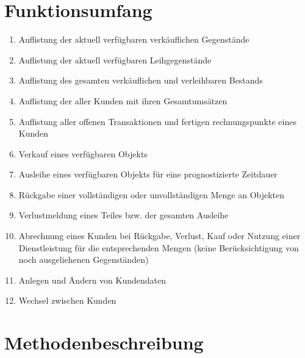 \documentclass[a4paper,12pt,titlepage]{article}
\begin{document}
\part{Funktionsumfang}
\begin{enumerate}
\item Auflistung der aktuell verfügbaren verkäuflichen Gegenstände
\item Auflistung der aktuell verfügbaren  Leihgegenstände
\item Auflistung des gesamten verkäuflichen und verleihbaren Bestands
\item Auflistung der aller Kunden mit ihren Gesamtumsätzen
\item Auflistung aller offenen Transaktionen  und fertigen rechnungspunkte eines Kunden
\item Verkauf eines verfügbaren Objekts
\item Ausleihe eines verfügbaren Objekts für eine prognostizierte Zeitdauer
\item Rückgabe einer vollständigen oder unvollständigen Menge an Objekten
\item Verlustmeldung eines Teiles bzw. der gesamten Ausleihe
\item Abrechnung eines Kunden bei  Rückgabe, Verlust, Kauf oder Nutzung einer Dienstleistung für die entsprechenden Mengen (keine Berücksichtigung von noch ausgeliehenen Gegenständen)
\item Anlegen und Ändern von Kundendaten
\item Wechsel zwischen Kunden
\end{enumerate}
\part{Methodenbeschreibung}
\end{document}
